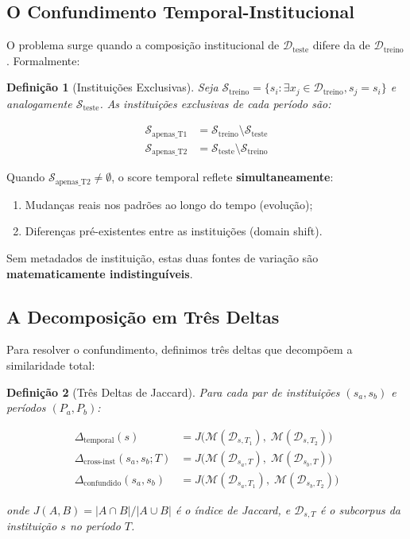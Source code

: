 \documentclass[12pt,a4paper]{article}
\newtheorem{defi}{Definição}[section]
\theoremstyle{remark}
\begin{document}
\subsection{O Confundimento Temporal-Institucional}

O problema surge quando a composição institucional de $\mathcal{D}_{\text{teste}}$ difere da de $\mathcal{D}_{\text{treino}}$. Formalmente:

\begin{defi}[Instituições Exclusivas]
Seja $\mathcal{S}_{\text{treino}} = \{s_i : \exists x_j \in \mathcal{D}_{\text{treino}}, s_j = s_i\}$ e analogamente $\mathcal{S}_{\text{teste}}$. As instituições exclusivas de cada período são:

\begin{align}
\mathcal{S}_{\text{apenas\_T1}} &= \mathcal{S}_{\text{treino}} \setminus \mathcal{S}_{\text{teste}} \\
\mathcal{S}_{\text{apenas\_T2}} &= \mathcal{S}_{\text{teste}} \setminus \mathcal{S}_{\text{treino}}
\end{align}
\end{defi}

Quando $\mathcal{S}_{\text{apenas\_T2}} \neq \emptyset$, o score temporal reflete \textbf{simultaneamente}:
\begin{enumerate}[label=(\roman*), nosep]
  \item Mudanças reais nos padrões ao longo do tempo (evolução);
  \item Diferenças pré-existentes entre as instituições (domain shift).
\end{enumerate}

Sem metadados de instituição, estas duas fontes de variação são \textbf{matematicamente indistinguíveis}.

\subsection{A Decomposição em Três Deltas}

Para resolver o confundimento, definimos três deltas que decompõem a similaridade total:

\begin{defi}[Três Deltas de Jaccard]
Para cada par de instituições $(s_a, s_b)$ e períodos $(P_a, P_b)$:

\begin{align}
\Delta_{\text{temporal}}(s) &= J\big(\mathcal{M}(\mathcal{D}_{s, T_1}),\; \mathcal{M}(\mathcal{D}_{s, T_2})\big) \label{eq:delta_t} \\
\Delta_{\text{cross-inst}}(s_a, s_b; T) &= J\big(\mathcal{M}(\mathcal{D}_{s_a, T}),\; \mathcal{M}(\mathcal{D}_{s_b, T})\big) \label{eq:delta_c} \\
\Delta_{\text{confundido}}(s_a, s_b) &= J\big(\mathcal{M}(\mathcal{D}_{s_a, T_1}),\; \mathcal{M}(\mathcal{D}_{s_b, T_2})\big) \label{eq:delta_m}
\end{align}

onde $J(A,B) = |A \cap B| / |A \cup B|$ é o índice de Jaccard, e $\mathcal{D}_{s,T}$ é o subcorpus da instituição $s$ no período $T$.
\end{defi}
\end{document}
